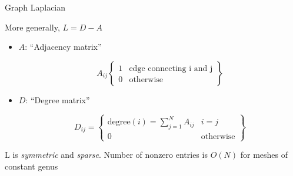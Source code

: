 \documentclass{beamer}
\begin{document}
\begin{frame}{Graph Laplacian}

More generally, $L = D - A$

\begin{itemize}[label=$\vartriangleright$]

\item $A$: ``Adjacency matrix''

\[ A_{ij} \left\{ \begin{array}{cc} 1 & \text{edge connecting i and j} \\ 0 & \text{otherwise}  \end{array} \right\} \]

\item $D$: ``Degree matrix''

\[ D_{ij} = \left\{ \begin{array}{cc} \text{degree}(i) = \sum_{j=1}^N A_{ij} & i = j\\ 0 & \text{otherwise} \end{array} \right\} \]

\end{itemize}

L is {\em symmetric} and {\em sparse}.  Number of nonzero entries is $O(N)$ for meshes of constant genus

\end{frame}
\end{document}

